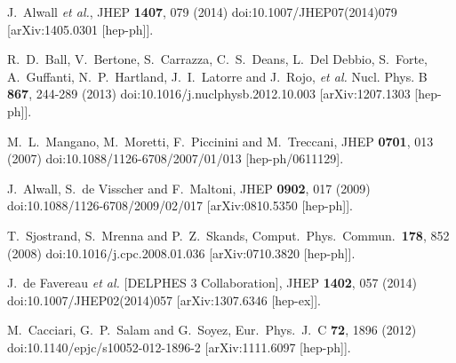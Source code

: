 \documentclass{ws-mpla}
\begin{document}
\begin{thebibliography}{99}
  J.~Alwall {\it et al.},
  JHEP {\bf 1407}, 079 (2014)
  doi:10.1007/JHEP07(2014)079
  [arXiv:1405.0301 [hep-ph]].
    
  R.~D.~Ball, V.~Bertone, S.~Carrazza, C.~S.~Deans, L.~Del Debbio, S.~Forte, A.~Guffanti, N.~P.~Hartland, J.~I.~Latorre and J.~Rojo, \textit{et al.}
  Nucl. Phys. B \textbf{867}, 244-289 (2013)
  doi:10.1016/j.nuclphysb.2012.10.003
  [arXiv:1207.1303 [hep-ph]].
  
  M.~L.~Mangano, M.~Moretti, F.~Piccinini and M.~Treccani,
  JHEP {\bf 0701}, 013 (2007)
  doi:10.1088/1126-6708/2007/01/013
  [hep-ph/0611129].

  J.~Alwall, S.~de Visscher and F.~Maltoni,
  JHEP {\bf 0902}, 017 (2009)
  doi:10.1088/1126-6708/2009/02/017
  [arXiv:0810.5350 [hep-ph]].

  T.~Sjostrand, S.~Mrenna and P.~Z.~Skands,
  Comput.\ Phys.\ Commun.\  {\bf 178}, 852 (2008)
  doi:10.1016/j.cpc.2008.01.036
  [arXiv:0710.3820 [hep-ph]].

  J.~de Favereau {\it et al.} [DELPHES 3 Collaboration],
  JHEP {\bf 1402}, 057 (2014)
  doi:10.1007/JHEP02(2014)057
  [arXiv:1307.6346 [hep-ex]].

  M.~Cacciari, G.~P.~Salam and G.~Soyez,
  Eur.\ Phys.\ J.\ C {\bf 72}, 1896 (2012)
  doi:10.1140/epjc/s10052-012-1896-2
  [arXiv:1111.6097 [hep-ph]].


\end{thebibliography}
\end{document}
